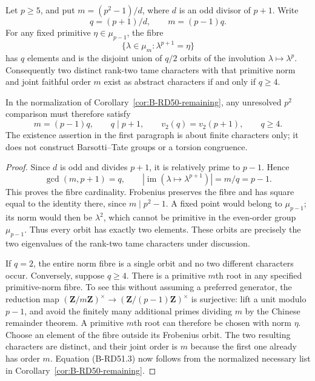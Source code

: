 \begin{lemma}
\label{lem:B-RD51-orbits}
Let $p\geq5$, and put $m=(p^2-1)/d$, where $d$ is an odd
divisor of $p+1$. Write
\[
                      q=(p+1)/d,\qquad m=(p-1)q.
                                                        \tag{B-RD51.1}
\]
For any fixed primitive $\eta\in\mu_{p-1}$, the fibre
\[
             \{\lambda\in\mu_m:\lambda^{p+1}=\eta\}
                                                        \tag{B-RD51.2}
\]
has $q$ elements and is the disjoint union of $q/2$ orbits
of the involution $\lambda\mapsto\lambda^p$.
Consequently two distinct rank-two tame characters with that
primitive norm and joint faithful order $m$ exist as abstract
characters if and only if $q\geq4$.

In the normalization of Corollary~\ref{cor:B-RD50-remaining},
any unresolved $p^2$ comparison must therefore satisfy
\[
 m=(p-1)q,\qquad q\mid p+1,\qquad
 v_2(q)=v_2(p+1),\qquad q\geq4.                         \tag{B-RD51.3}
\]
The existence assertion in the first paragraph is about finite
characters only; it does not construct Barsotti--Tate groups
or a torsion congruence.
\end{lemma}
\begin{proof}
Since $d$ is odd and divides $p+1$, it is relatively prime to
$p-1$. Hence
\[
             \gcd(m,p+1)=q,\qquad
             |\operatorname{im}(\lambda\mapsto\lambda^{p+1})|
                      =m/q=p-1.
\]
This proves the fibre cardinality. Frobenius preserves the
fibre and has square equal to the identity there, since
$m\mid p^2-1$. A fixed point would belong to $\mu_{p-1}$;
its norm would then be $\lambda^2$, which cannot be primitive
in the even-order group $\mu_{p-1}$. Thus every orbit has
exactly two elements. These orbits are precisely the two
eigenvalues of the rank-two tame characters under discussion.

If $q=2$, the entire norm fibre is a single orbit and no two
different characters occur. Conversely, suppose $q\geq4$.
There is a primitive $m$th root in any specified primitive-norm
fibre. To see this without assuming a preferred generator,
the reduction map $(\mathbf Z/m\mathbf Z)^\times\to
(\mathbf Z/(p-1)\mathbf Z)^\times$ is surjective: lift a unit
modulo $p-1$, and avoid the finitely many additional primes
dividing $m$ by the Chinese remainder theorem. A primitive
$m$th root can therefore be chosen with norm $\eta$.
Choose an element of the fibre outside its Frobenius orbit.
The two resulting characters are distinct, and their joint
order is $m$ because the first one already has order $m$.
Equation (B-RD51.3) now follows from the normalized necessary
list in Corollary~\ref{cor:B-RD50-remaining}.
\end{proof}


